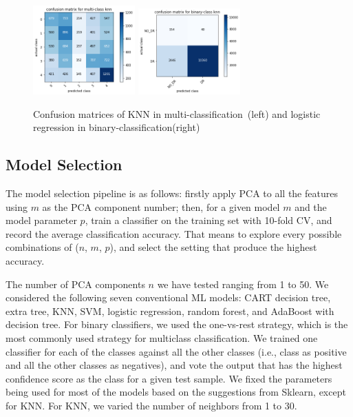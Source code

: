 \begin{figure}[t]
\centering
\includegraphics[width=0.35\textwidth]{multi.png}
\includegraphics[width=0.35\textwidth]{binary_knn.png}
\caption{Confusion matrices of KNN 
in multi-classification~(left) and logistic regression in binary-classification(right) }
\label{cmmulti}
\end{figure}

\subsection{Model Selection}

The model selection pipeline is as follows: firstly apply PCA to all the features using $m$ as the PCA component number; then, for a given model $m$ and the model parameter $p$, train a classifier on the training set with 10-fold CV, and record the average classification accuracy. That means to explore every possible combinations of ($n$, $m$, $p$), and select the setting that produce the highest accuracy. 

The number of PCA components $n$ we have tested ranging from 1 to 50. We considered the following seven conventional ML models: CART decision tree, extra tree, KNN,  SVM, logistic regression, random forest, and AdaBoost with decision tree.  For binary classifiers, we used the one-vs-rest strategy, which is the most commonly used strategy for multiclass classification.  We trained one classifier for each of the classes against all the other classes (i.e., class as positive and all the other classes as negatives), and vote the output that has the highest confidence score as the class for a given test sample. We fixed the parameters being used for most of the models based on the suggestions from Sklearn, except for KNN. For KNN, we varied the number of neighbors from 1 to 30. 

